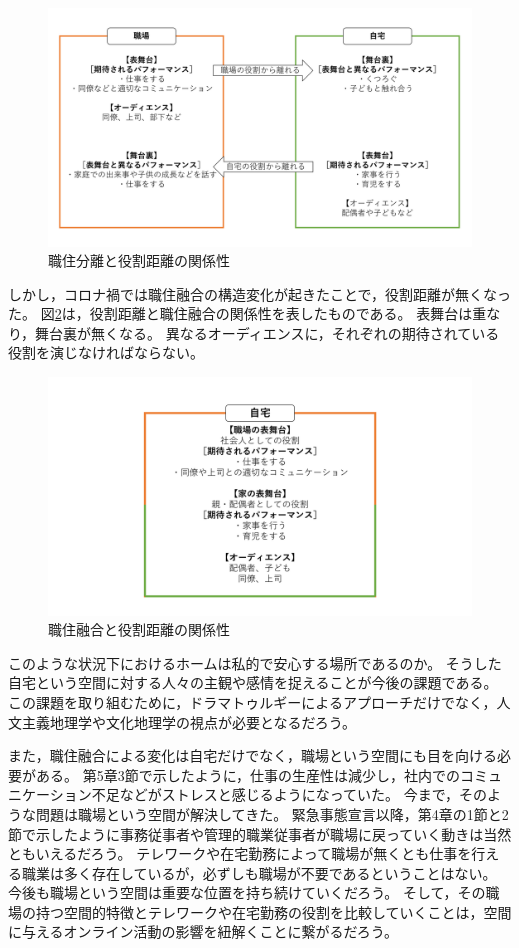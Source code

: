 \documentclass[paper={210mm,297mm},fontsize=15Q,line_length=35zw,number_of_lines=31,head_space=30mm,gutter=40mm,baselineskip=2.0zw,headfoot_verticalposition=1.5zw]{jlreq}
\begin{document}
\begin{figure}[H]
  \centering
  \includegraphics[width=120mm]{../Figure/c06s02_figure_職住分離と役割距離の関係性.png}
  \caption{職住分離と役割距離の関係性}
  \label{職住分離の構造}
\end{figure}

しかし，コロナ禍では職住融合の構造変化が起きたことで，役割距離が無くなった。
図\ref{職住融合の構造}は，役割距離と職住融合の関係性を表したものである。
表舞台は重なり，舞台裏が無くなる。
異なるオーディエンスに，それぞれの期待されている役割を演じなければならない。

\begin{figure}[H]
  \centering
  \includegraphics[width=120mm]{../Figure/c06s02_figure_職住融合と役割距離の関係性.png}
  \caption{職住融合と役割距離の関係性}
  \label{職住融合の構造}
\end{figure}

このような状況下におけるホームは私的で安心する場所であるのか。
そうした自宅という空間に対する人々の主観や感情を捉えることが今後の課題である。
この課題を取り組むために，ドラマトゥルギーによるアプローチだけでなく，人文主義地理学や文化地理学の視点が必要となるだろう。

また，職住融合による変化は自宅だけでなく，職場という空間にも目を向ける必要がある。
第5章3節で示したように，仕事の生産性は減少し，社内でのコミュニケーション不足などがストレスと感じるようになっていた。
今まで，そのような問題は職場という空間が解決してきた。
緊急事態宣言以降，第4章の1節と2節で示したように事務従事者や管理的職業従事者が職場に戻っていく動きは当然ともいえるだろう。
テレワークや在宅勤務によって職場が無くとも仕事を行える職業は多く存在しているが，必ずしも職場が不要であるということはない。
今後も職場という空間は重要な位置を持ち続けていくだろう。
そして，その職場の持つ空間的特徴とテレワークや在宅勤務の役割を比較していくことは，空間に与えるオンライン活動の影響を紐解くことに繋がるだろう。
\end{document}
